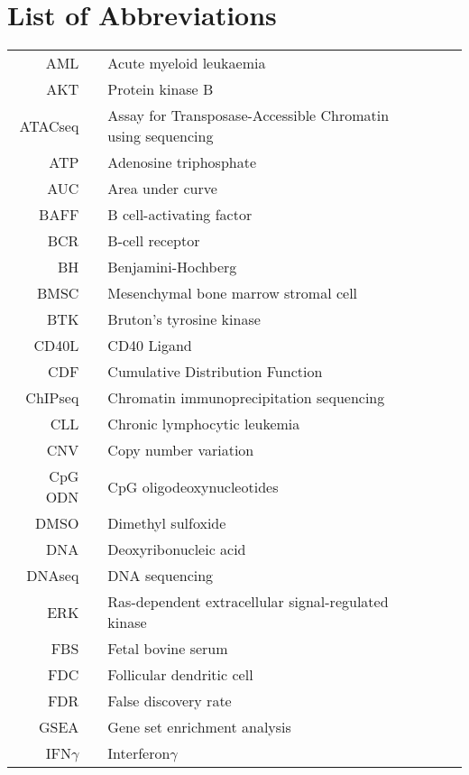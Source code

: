 \documentclass[11pt, a4paper, twosided]{book}
\begin{document}
\newpage
\tableofcontents
\clearpage

\newpage
\hypertarget{list-of-abbreviations}{%
\chapter*{List of Abbreviations}\label{list-of-abbreviations}}
\begin{tabular}{rp{0.2cm}lp{1cm}rp{0.2cm}l}
    AML & & Acute myeloid leukaemia \\
    AKT & & Protein kinase B \\
    ATACseq & & Assay for Transposase-Accessible Chromatin using sequencing \\
    ATP & & Adenosine triphosphate \\
    AUC & & Area under curve \\
    BAFF & & B cell-activating factor \\
    BCR & & B-cell receptor \\
    BH & & Benjamini-Hochberg \\
    BMSC & & Mesenchymal bone marrow stromal cell \\
    BTK & & Bruton’s tyrosine kinase \\
    CD40L & & CD40 Ligand \\
    CDF & & Cumulative Distribution Function \\
    ChIPseq & & Chromatin immunoprecipitation sequencing \\
    CLL & & Chronic lymphocytic leukemia \\
    CNV & & Copy number variation \\
    CpG ODN & & CpG oligodeoxynucleotides \\
    DMSO & & Dimethyl sulfoxide  \\
    DNA & & Deoxyribonucleic acid  \\
    DNAseq & & DNA sequencing \\
    ERK & & Ras-dependent extracellular signal-regulated kinase \\
    FBS & & Fetal bovine serum \\
    FDC & & Follicular dendritic cell \\
    FDR & & False discovery rate \\
    GSEA & & Gene set enrichment analysis  \\
    IFN$\gamma$ & & Interferon$\gamma$   \\ 
    
\end{tabular}
\end{document}
